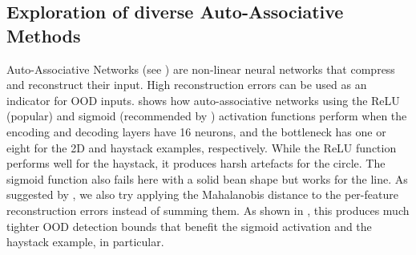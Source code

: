 \subsection{Exploration of diverse Auto-Associative Methods} \label{txt:ood-detection-analyis-auto-associative}

Auto-Associative Networks (see ) are non-linear neural networks that compress and reconstruct their input. High reconstruction errors can be used as an indicator for OOD inputs.  shows how auto-associative networks using the ReLU (popular) and sigmoid (recommended by \textcite{auto-associative-2001}) activation functions perform when the encoding and decoding layers have 16 neurons, and the bottleneck has one or eight for the 2D and haystack examples, respectively. While the ReLU function performs well for the haystack, it produces harsh artefacts for the circle. The sigmoid function also fails here with a solid bean shape but works for the line. As suggested by \textcite{dime-detector-2021}, we also try applying the Mahalanobis distance to the per-feature reconstruction errors instead of summing them. As shown in , this produces much tighter OOD detection bounds that benefit the sigmoid activation and the haystack example, in particular.

